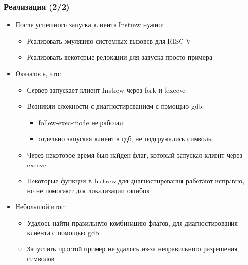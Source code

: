 \documentclass{beamer}
\begin{document}
\begin{frame}[fragile]
  \frametitle{Реализация (2/2)}
  \begin{itemize}
    \item После успешного запуска клиента Instrew нужно:
          \begin{itemize}
            \item Реализовать эмуляцию системных вызовов для RISC-V
            \item Реализовать некоторые релокации для запуска просто примера
          \end{itemize}
    \item Оказалось, что:
          \begin{itemize}
            \item Сервер запускает клиент Instrew через fork и fexecve
            \item Возникли сложности с диагностированием с помощью gdb:
                  \begin{itemize}
                    \item follow-exec-mode не работал
                    \item отдельно запуская клиент в гдб, не подгружались символы
                  \end{itemize}
            \item Через некоторое время был найден флаг, который запускал клиент через execve
            \item Некоторые функции в Instrew для диагностирования работают исправно, но не помогают для локализации ошибок
          \end{itemize}
    \item Небольшой итог:
          \begin{itemize}
            \item Удалось найти правильную комбинацию флагов, для диагностирования клиента с помощью gdb
            \item Запустить простой пример не удалось из-за неправильного разрешения символов
          \end{itemize}
  \end{itemize}
\end{frame}

\end{document}
